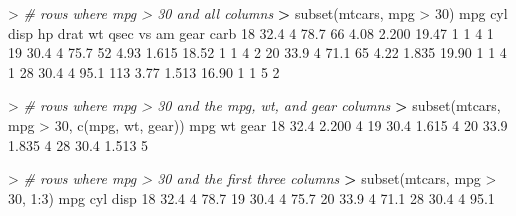 \documentclass[
]{book}
\newenvironment{Shaded}{\begin{snugshade}}{\end{snugshade}}
\newcommand{\CommentTok}[1]{\textcolor[rgb]{0.56,0.35,0.01}{\textit{#1}}}
\newcommand{\DecValTok}[1]{\textcolor[rgb]{0.00,0.00,0.81}{#1}}
\newcommand{\ErrorTok}[1]{\textcolor[rgb]{0.64,0.00,0.00}{\textbf{#1}}}
\newcommand{\FloatTok}[1]{\textcolor[rgb]{0.00,0.00,0.81}{#1}}
\newcommand{\FunctionTok}[1]{\textcolor[rgb]{0.00,0.00,0.00}{#1}}
\newcommand{\NormalTok}[1]{#1}
\newcommand{\SpecialCharTok}[1]{\textcolor[rgb]{0.00,0.00,0.00}{#1}}
\begin{document}
\begin{Shaded}
\begin{Highlighting}[]
\SpecialCharTok{\textgreater{}} \CommentTok{\# rows where mpg \textgreater{} 30 and all columns}
\ErrorTok{\textgreater{}} \FunctionTok{subset}\NormalTok{(mtcars, mpg }\SpecialCharTok{\textgreater{}} \DecValTok{30}\NormalTok{)}
\NormalTok{    mpg cyl disp  hp drat    wt  qsec vs am gear carb}
\DecValTok{18} \FloatTok{32.4}   \DecValTok{4} \FloatTok{78.7}  \DecValTok{66} \FloatTok{4.08} \FloatTok{2.200} \FloatTok{19.47}  \DecValTok{1}  \DecValTok{1}    \DecValTok{4}    \DecValTok{1}
\DecValTok{19} \FloatTok{30.4}   \DecValTok{4} \FloatTok{75.7}  \DecValTok{52} \FloatTok{4.93} \FloatTok{1.615} \FloatTok{18.52}  \DecValTok{1}  \DecValTok{1}    \DecValTok{4}    \DecValTok{2}
\DecValTok{20} \FloatTok{33.9}   \DecValTok{4} \FloatTok{71.1}  \DecValTok{65} \FloatTok{4.22} \FloatTok{1.835} \FloatTok{19.90}  \DecValTok{1}  \DecValTok{1}    \DecValTok{4}    \DecValTok{1}
\DecValTok{28} \FloatTok{30.4}   \DecValTok{4} \FloatTok{95.1} \DecValTok{113} \FloatTok{3.77} \FloatTok{1.513} \FloatTok{16.90}  \DecValTok{1}  \DecValTok{1}    \DecValTok{5}    \DecValTok{2}
\end{Highlighting}
\end{Shaded}

\begin{Shaded}
\begin{Highlighting}[]
\SpecialCharTok{\textgreater{}} \CommentTok{\# rows where mpg \textgreater{} 30 and the mpg, wt, and gear columns}
\ErrorTok{\textgreater{}} \FunctionTok{subset}\NormalTok{(mtcars, mpg }\SpecialCharTok{\textgreater{}} \DecValTok{30}\NormalTok{, }\FunctionTok{c}\NormalTok{(mpg, wt, gear))}
\NormalTok{    mpg    wt gear}
\DecValTok{18} \FloatTok{32.4} \FloatTok{2.200}    \DecValTok{4}
\DecValTok{19} \FloatTok{30.4} \FloatTok{1.615}    \DecValTok{4}
\DecValTok{20} \FloatTok{33.9} \FloatTok{1.835}    \DecValTok{4}
\DecValTok{28} \FloatTok{30.4} \FloatTok{1.513}    \DecValTok{5}
\end{Highlighting}
\end{Shaded}

\begin{Shaded}
\begin{Highlighting}[]
\SpecialCharTok{\textgreater{}} \CommentTok{\# rows where mpg \textgreater{} 30 and the first three columns}
\ErrorTok{\textgreater{}} \FunctionTok{subset}\NormalTok{(mtcars, mpg }\SpecialCharTok{\textgreater{}} \DecValTok{30}\NormalTok{, }\DecValTok{1}\SpecialCharTok{:}\DecValTok{3}\NormalTok{)}
\NormalTok{    mpg cyl disp}
\DecValTok{18} \FloatTok{32.4}   \DecValTok{4} \FloatTok{78.7}
\DecValTok{19} \FloatTok{30.4}   \DecValTok{4} \FloatTok{75.7}
\DecValTok{20} \FloatTok{33.9}   \DecValTok{4} \FloatTok{71.1}
\DecValTok{28} \FloatTok{30.4}   \DecValTok{4} \FloatTok{95.1}
\end{Highlighting}
\end{Shaded}
\end{document}
